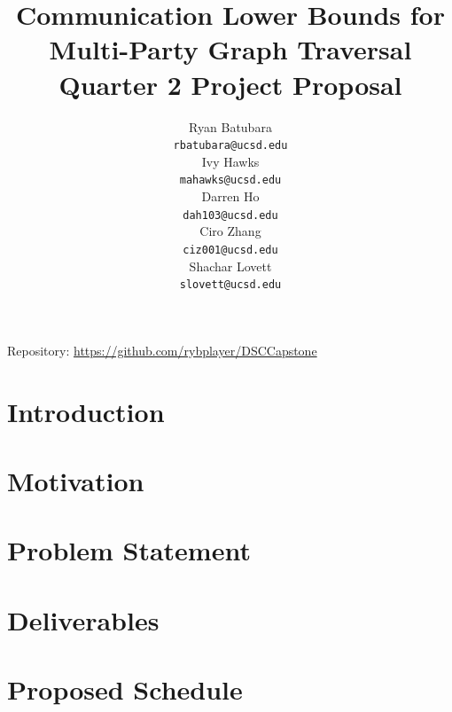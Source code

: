 \documentclass[12pt,letterpaper]{article}
\title{Communication Lower Bounds for \\
Multi-Party Graph Traversal \medbreak
\large Quarter 2 Project Proposal}
\author{
    Ryan Batubara \\ 
    {\tt \small{rbatubara@ucsd.edu}} \\\And
    Ivy Hawks \\
    {\tt \small{mahawks@ucsd.edu}} \\\And
    Darren Ho \\
    {\tt \small{dah103@ucsd.edu}} \\\And
    Ciro Zhang \\
    {\tt \small{ciz001@ucsd.edu}} \\\And
    Shachar Lovett \\
    {\tt \small{slovett@ucsd.edu}} \\}
\begin{document}
\maketitle


\begin{abstract}
    
\end{abstract}

\begin{center}
Repository: \url{https://github.com/rybplayer/DSCCapstone}
\end{center}

\maketoc
\clearpage


\section{Introduction}


\section{Motivation}


\section{Problem Statement}


\section{Deliverables}


\section{Proposed Schedule}


\makereference


\nocite{*}



\end{document}
